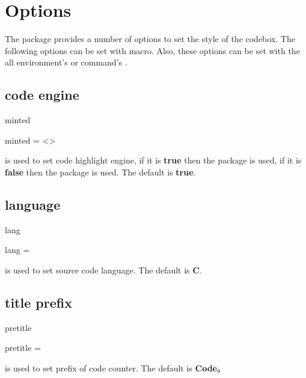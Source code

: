 \documentclass{ctxdoc-en}
\begin{document}
\begin{center}
  \begin{minipage}{0.85\textwidth}
  \end{minipage}
\end{center}

\section{Options}

The  package provides a number of options to set the style of the codebox.
The following options can be set with  macro.
Also, these options can be set with the all environment's
or command's .

\subsection{code engine}

\begin{function}[added=2021-12-26,updated=2021-12-26]{minted}
  \begin{syntax}
    minted = <\TTF> 
  \end{syntax}
   is used to set code highlight engine, if it is \textbf{true} then
  the  package is used, if it is \textbf{false} then
  the  package is used. The default is \textbf{true}.
\end{function}

\subsection{language}

\begin{function}[added=2021-12-26,updated=2021-12-26]{lang}
  \begin{syntax}
    lang =  
  \end{syntax}
   is used to set source code language.
  The default is \textbf{C}.
\end{function}

\subsection{title prefix}

\begin{function}[added=2021-12-26,updated=2021-12-26]{pretitle}
  \begin{syntax}
    pretitle =  
  \end{syntax}
   is used to set prefix of code counter.
  The default is \textbf{Code}。
\end{function}
\end{document}
